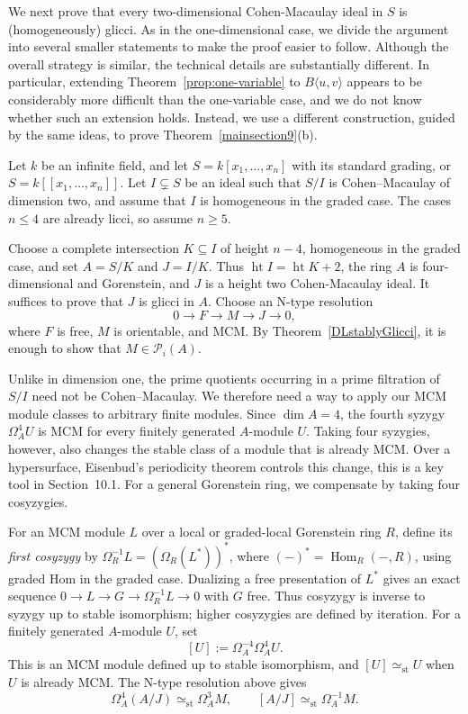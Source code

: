 \documentclass[11pt,letterpaper]{amsart}
\theoremstyle{plain}
\theoremstyle{definition}
\theoremstyle{remark}
\begin{document}
We next prove that every two-dimensional Cohen-Macaulay ideal in $S$ is (homogeneously) glicci. As in the one-dimensional case, we divide the argument into several smaller statements to make the proof easier to follow. Although the overall strategy is similar, the technical details are substantially different. In particular, extending Theorem~\ref{prop:one-variable} to $B\langle u,v\rangle$ appears to be considerably more difficult than the one-variable case, and we do not know whether such an extension holds. Instead, we use a different construction, guided by the same ideas, to prove Theorem~\ref{mainsection9}(b).

Let $k$ be an infinite field, and let $S=k[x_1,\ldots,x_n]$ with its standard grading, or $S=k[[x_1,\ldots,x_n]]$. Let $I\subsetneq S$ be an ideal such that $S/I$ is Cohen--Macaulay of dimension two, and assume that $I$ is homogeneous in the graded case. The cases $n\leq4$ are already licci, so assume $n\geq5$.

Choose a complete intersection $K\subseteq I$ of height $n-4$, homogeneous in the graded case, and set $A=S/K$ and $J=I/K$. Thus $\operatorname{ht}I=\operatorname{ht}K+2$, the ring $A$ is four-dimensional and Gorenstein, and $J$ is a height two Cohen-Macaulay ideal. It suffices to prove that $J$ is glicci in $A$. Choose an N-type resolution
\[
0\longrightarrow F\longrightarrow M\longrightarrow J\longrightarrow0,
\]
where $F$ is free, $M$ is orientable, and MCM. By Theorem~\ref{DLstablyGlicci}, it is enough to show that $M\in\mathcal P_i(A)$.

Unlike in dimension one, the prime quotients occurring in a prime filtration of $S/I$ need not be Cohen--Macaulay. We therefore need a way to apply our MCM module classes to arbitrary finite modules. Since $\dim A=4$, the fourth syzygy $\Omega_A^4U$ is MCM for every finitely generated $A$-module $U$. Taking four syzygies, however, also changes the stable class of a module that is already MCM. Over a hypersurface, Eisenbud's periodicity theorem controls this change, this is a key tool in Section~10.1. For a general Gorenstein ring, we compensate by taking four cosyzygies.

For an MCM module $L$ over a local or graded-local Gorenstein ring $R$, define its \emph{first cosyzygy} by $\Omega_R^{-1}L=(\Omega_R(L^*))^*$, where $(-)^*=\operatorname{Hom}_R(-,R)$, using graded Hom in the graded case. Dualizing a free presentation of $L^*$ gives an exact sequence $0\to L\to G\to\Omega_R^{-1}L\to0$ with $G$ free. Thus cosyzygy is inverse to syzygy up to stable isomorphism; higher cosyzygies are defined by iteration. For a finitely generated $A$-module $U$, set
\[
[U]:=\Omega_A^{-4}\Omega_A^4U.
\]
This is an MCM module defined up to stable isomorphism, and $[U]\simeq_{\mathrm{st}}U$ when $U$ is already MCM. The N-type resolution above gives
\[
\Omega_A^4(A/J)\simeq_{\mathrm{st}}\Omega_A^3M,\qquad [A/J]\simeq_{\mathrm{st}}\Omega_A^{-1}M.
\]
\end{document}
